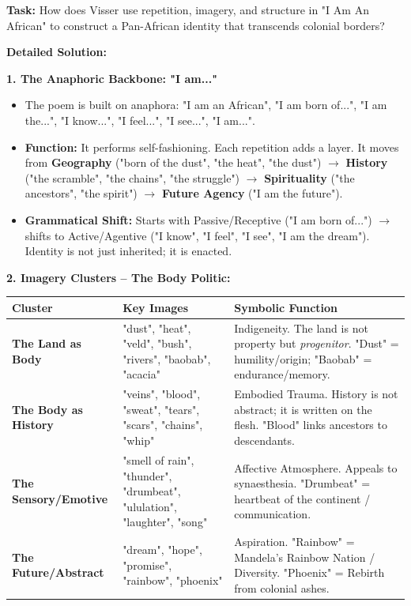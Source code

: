 \documentclass[11pt]{article}
\newcommand{\cle}[1]{{\popxbold\color{popdark}#1}}
\begin{document}
\begin{exoresolu}
\textbf{Task:} How does Visser use repetition, imagery, and structure in "I Am An African" to construct a Pan-African identity that transcends colonial borders?

\tcblower
\textbf{Detailed Solution:}

\textbf{1. The Anaphoric Backbone: "I am..."}
\begin{itemize}
    \item The poem is built on \cle{anaphora}: "I am an African", "I am born of...", "I am the...", "I know...", "I feel...", "I see...", "I am...".
    \item \textbf{Function:} It performs \cle{self-fashioning}. Each repetition adds a layer. It moves from \textbf{Geography} ("born of the dust", "the heat", "the dust") $\rightarrow$ \textbf{History} ("the scramble", "the chains", "the struggle") $\rightarrow$ \textbf{Spirituality} ("the ancestors", "the spirit") $\rightarrow$ \textbf{Future Agency} ("I am the future").
    \item \textbf{Grammatical Shift:} Starts with \cle{Passive/Receptive} ("I am born of...") $\rightarrow$ shifts to \cle{Active/Agentive} ("I know", "I feel", "I see", "I am the dream"). Identity is not just inherited; it is \cle{enacted}.
\end{itemize}

\textbf{2. Imagery Clusters -- The Body Politic:}
\begin{center}
\begin{tabularx}{\linewidth}{|l|X|l|}
\hline
\rowcolor{popblueL} \textbf{Cluster} & \textbf{Key Images} & \textbf{Symbolic Function} \\
\hline
\textbf{The Land as Body} & "dust", "heat", "veld", "bush", "rivers", "baobab", "acacia" & \cle{Indigeneity}. The land is not property but \emph{progenitor}. "Dust" = humility/origin; "Baobab" = endurance/memory. \\
\hline
\textbf{The Body as History} & "veins", "blood", "sweat", "tears", "scars", "chains", "whip" & \cle{Embodied Trauma}. History is not abstract; it is written on the flesh. "Blood" links ancestors to descendants. \\
\hline
\textbf{The Sensory/Emotive} & "smell of rain", "thunder", "drumbeat", "ululation", "laughter", "song" & \cle{Affective Atmosphere}. Appeals to \cle{synaesthesia}. "Drumbeat" = heartbeat of the continent / communication. \\
\hline
\textbf{The Future/Abstract} & "dream", "hope", "promise", "rainbow", "phoenix" & \cle{Aspiration}. "Rainbow" = Mandela's Rainbow Nation / Diversity. "Phoenix" = Rebirth from colonial ashes. \\
\hline
\end{tabularx}
\end{center}


\end{exoresolu}
\end{document}
